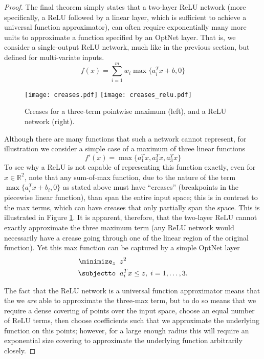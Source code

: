 \begin{proof}
The final theorem simply states that a two-layer ReLU network (more
specifically, a ReLU followed by a linear layer, which is sufficient to achieve
a universal function approximator), can often require exponentially many more
units to approximate a function specified by an OptNet layer. That is, we
consider a single-output ReLU network, much like in the previous section, but
defined for multi-variate inputs.
\begin{equation}
  f(x) = \sum_{i=1}^m w_i \max \{ a_i^T x + b, 0\}
\end{equation}

\begin{figure}[t]
  \centering
  \texttt{[image: creases.pdf]}
  \texttt{[image: creases\_relu.pdf]}
  \caption{Creases for a three-term pointwise maximum (left), and a ReLU network
    (right).}
  \label{fig:creases}
\end{figure}

Although there are many functions that such a network cannot represent, for
illustration we consider a simple case of a maximum of three linear functions
\begin{equation}
  f'(x) = \max\{a_1^Tx, a_2^T x, a_3^T x\}
\end{equation}
To see why a ReLU is not capable of representing this function exactly, even for
$x \in \mathbb{R}^2$, note that any sum-of-max function, due to the nature of
the term $\max\{a_i^Tx + b_i, 0\}$ as stated above must have ``creases''
(breakpoints in the piecewise linear function), than span the entire input
space; this is in contrast to the max terms, which can have creases that only
partially span the space.  This is illustrated in Figure \ref{fig:creases}.  It
is apparent, therefore, that the two-layer ReLU cannot exactly approximate the
three maximum term (any ReLU network would necessarily have a crease going
through one of the linear region of the original function).  Yet this max
function can be captured by a simple OptNet layer
\begin{equation}
  \begin{split}
    \minimize_z \;\; & z^2  \\
    \subjectto \;\; & a_i^T x \leq z, \; i=1,\ldots, 3.
  \end{split}
\end{equation}

The fact that the ReLU network is a universal function approximator means that
the we \emph{are} able to approximate the three-max term, but to do so means
that we require a dense covering of points over the input space, choose an equal
number of ReLU terms, then choose coefficients such that we approximate the
underlying function on this points; however, for a large enough radius this will
require an exponential size covering to approximate the underlying function
arbitrarily closely.
\end{proof}

